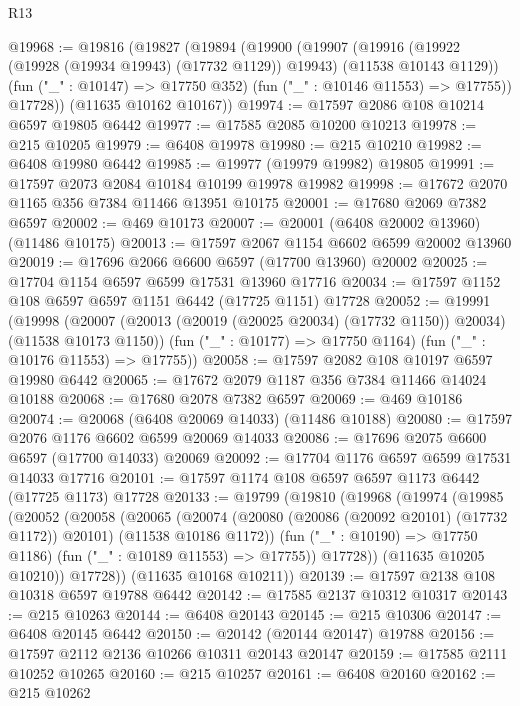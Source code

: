 \begin{lexlean}{R13}
\begin{coremodule}
@19968 := @19816
    (@19827
      (@19894
        (@19900
          (@19907
            (@19916 (@19922 (@19928 (@19934 @19943) (@17732 @1129)) @19943) (@11538 @10143 @1129))
            (fun ("_" : @10147) => @17750 @352)
            (fun ("_" : @10146 @11553) => @17755))
          @17728))
      (@11635 @10162 @10167))
@19974 := @17597 @2086 @108 @10214 @6597 @19805 @6442
@19977 := @17585 @2085 @10200 @10213
@19978 := @215 @10205
@19979 := @6408 @19978
@19980 := @215 @10210
@19982 := @6408 @19980 @6442
@19985 := @19977 (@19979 @19982) @19805
@19991 := @17597 @2073 @2084 @10184 @10199 @19978 @19982
@19998 := @17672 @2070 @1165 @356 @7384 @11466 @13951 @10175
@20001 := @17680 @2069 @7382 @6597
@20002 := @469 @10173
@20007 := @20001 (@6408 @20002 @13960) (@11486 @10175)
@20013 := @17597 @2067 @1154 @6602 @6599 @20002 @13960
@20019 := @17696 @2066 @6600 @6597 (@17700 @13960) @20002
@20025 := @17704 @1154 @6597 @6599 @17531 @13960 @17716
@20034 := @17597 @1152 @108 @6597 @6597 @1151 @6442 (@17725 @1151) @17728
@20052 := @19991
    (@19998
      (@20007 (@20013 (@20019 (@20025 @20034) (@17732 @1150)) @20034) (@11538 @10173 @1150))
      (fun ("_" : @10177) => @17750 @1164)
      (fun ("_" : @10176 @11553) => @17755))
@20058 := @17597 @2082 @108 @10197 @6597 @19980 @6442
@20065 := @17672 @2079 @1187 @356 @7384 @11466 @14024 @10188
@20068 := @17680 @2078 @7382 @6597
@20069 := @469 @10186
@20074 := @20068 (@6408 @20069 @14033) (@11486 @10188)
@20080 := @17597 @2076 @1176 @6602 @6599 @20069 @14033
@20086 := @17696 @2075 @6600 @6597 (@17700 @14033) @20069
@20092 := @17704 @1176 @6597 @6599 @17531 @14033 @17716
@20101 := @17597 @1174 @108 @6597 @6597 @1173 @6442 (@17725 @1173) @17728
@20133 := @19799
    (@19810
      (@19968
        (@19974
          (@19985
            (@20052
              (@20058
                (@20065
                  (@20074
                    (@20080 (@20086 (@20092 @20101) (@17732 @1172)) @20101)
                    (@11538 @10186 @1172))
                  (fun ("_" : @10190) => @17750 @1186)
                  (fun ("_" : @10189 @11553) => @17755))
                @17728))
            (@11635 @10205 @10210))
          @17728))
      (@11635 @10168 @10211))
@20139 := @17597 @2138 @108 @10318 @6597 @19788 @6442
@20142 := @17585 @2137 @10312 @10317
@20143 := @215 @10263
@20144 := @6408 @20143
@20145 := @215 @10306
@20147 := @6408 @20145 @6442
@20150 := @20142 (@20144 @20147) @19788
@20156 := @17597 @2112 @2136 @10266 @10311 @20143 @20147
@20159 := @17585 @2111 @10252 @10265
@20160 := @215 @10257
@20161 := @6408 @20160
@20162 := @215 @10262

\end{coremodule}
\end{lexlean}
